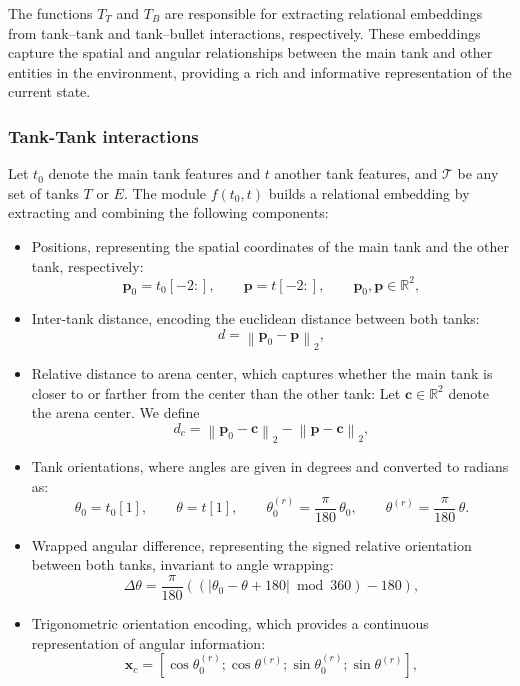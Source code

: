 \documentclass[conf]{new-aiaa}
\begin{document}
The functions $T_T$ and $T_B$ are responsible for extracting relational embeddings from tank--tank and tank--bullet interactions, respectively. These embeddings capture the spatial and angular relationships between the main tank and other entities in the environment, providing a rich and informative representation of the current state.

\subsubsection{Tank-Tank interactions}
Let $t_0$ denote the main tank features and $t$ another tank features, and $\mathcal{T}$ be any set of tanks $T$ or $E$. The module $f(t_0,t)$ builds a relational embedding by extracting and combining the following components:

\begin{itemize}
    \item {Positions, representing the spatial coordinates of the main tank and the other tank, respectively:}
    \[
    \mathbf{p}_0 = t_0[-2:], \qquad \mathbf{p} = t[-2:], \qquad \mathbf{p}_0,\mathbf{p}\in\mathbb{R}^2,
    \]

    \item {Inter-tank distance, encoding the euclidean distance between both tanks:}
    \[
    d = \left\lVert \mathbf{p}_0 - \mathbf{p} \right\rVert_2,
    \]

    \item {Relative distance to arena center, which captures whether the main tank is closer to or farther from the center than the other tank:}
    Let $\mathbf{c}\in\mathbb{R}^2$ denote the arena center. We define
    \[
    d_c = \left\lVert \mathbf{p}_0 - \mathbf{c} \right\rVert_2 - \left\lVert \mathbf{p} - \mathbf{c} \right\rVert_2,
    \]

    \item {Tank orientations, where angles are given in degrees and converted to radians as:}
    \[
    \theta_0 = t_0[1], \qquad \theta = t[1], \qquad
    \theta_0^{(r)}=\frac{\pi}{180}\,\theta_0,
    \qquad
    \theta^{(r)}=\frac{\pi}{180}\,\theta.
    \]

    \item {Wrapped angular difference, representing the signed relative orientation between both tanks, invariant to angle wrapping:}
    \[
    \Delta\theta
    =
    \frac{\pi}{180}\left(\left(\left|\theta_0-\theta+180\right|\bmod 360\right)-180\right),
    \]

    \item {Trigonometric orientation encoding, which provides a continuous representation of angular information:}
    \[
    \mathbf{x}_{c}
    =
    [\cos\theta_0^{(r)};\cos\theta^{(r)};\sin\theta_0^{(r)};\sin\theta^{(r)}],
    \]
\end{itemize}
\end{document}
